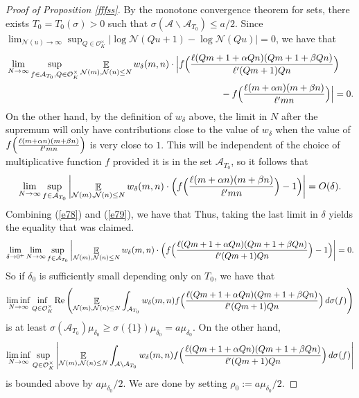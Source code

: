 \documentclass[11pt]{amsart}
\theoremstyle{definition}
\DeclareMathOperator*{\E}{\mathbb{E}}
\newcommand{\NN}{{\mathcal N}}
\begin{document}
\begin{proof}[Proof of Proposition \ref{fffss}]
By the monotone convergence theorem for sets, there exists $T_{0}=T_{0}(\sigma)>0$ such that $\sigma(\mathcal{A}\backslash\mathcal{A}_{T_{0}})\leq a/2$.
Since $\lim_{\NN(u)\to\infty}\sup_{Q\in \mathcal O_K^{\times}}\vert\log\NN(Qu+1)-\log\NN(Qu)\vert=0$,
we have that 
\begin{equation}\label{e78}
    \begin{split}
        &\lim_{N\to\infty}\sup_{f\in \mathcal{A}_{T_{0}},Q\in\mathcal O_K^{\times}}\E_{\NN(m), \NN(n) \leq N}w_{\delta}(m,n)\cdot\Bigl\vert f\Bigl(\frac{\ell(Qm+1+\alpha Qn)(Qm+1+\beta Qn)}{\ell'(Qm+1)Qn}\Bigr) 
        \\&\quad\quad\quad\quad\quad\quad\quad\quad\quad\quad\quad\quad\quad\quad\quad\quad\quad\quad\quad\quad\quad\quad\;\;\;\;-f\Bigl(\frac{\ell(m+\alpha n)(m+\beta n)}{\ell'mn}\Bigr)\Bigr\vert=0.
    \end{split}
\end{equation}
On the other hand, by the definition of $w_{\delta}$ above, the limit in $N$ after the supremum will only have contributions close to the value of $w_{\delta}$ when the value of $f\Bigl(\frac{\ell(m+\alpha n)(m+\beta n)}{\ell'mn}\Bigr)$ is very close to $1$. This will be independent of the choice of multiplicative function $f$ provided it is in the set $\mathcal{A}_{T_0}$, so it follows that
\begin{equation}\label{e79}
    \begin{split}
        \lim_{N\to\infty}\sup_{f\in \mathcal{A}_{T_{0}}} \left| \E_{\NN(m), \NN(n) \leq N}w_{\delta}(m,n)\cdot\Bigl( f\Bigl(\frac{\ell(m+\alpha n)(m+\beta n)}{\ell'mn}\Bigr)-1\Bigr)\right|=O(\delta).
    \end{split}
\end{equation}
 Combining (\ref{e78}) and (\ref{e79}), we have that 
Thus, taking the last limit in $\delta$ yields the equality that was claimed.
    \begin{equation}
    \begin{split}
       \lim_{\delta\to 0^{+}}\lim_{N\to\infty}\sup_{f\in \mathcal{A}_{T_{0}}} \left| \E_{\NN(m), \NN(n) \leq N}w_{\delta}(m,n)\cdot\Bigl( f\Bigl(\frac{\ell(Qm+1+\alpha Qn)(Qm+1+\beta Qn)}{\ell'(Qm+1)Qn}\Bigr)-1\Bigr)\right|=0.
    \end{split}
\end{equation}
So if $\delta_{0}$ is sufficiently small depending only on $T_{0}$, we have that
$$\liminf_{N\to\infty}\inf_{Q\in\mathcal O_K^{\times}}\text{Re}\left(\E_{\NN(m), \NN(n) \leq N}\int_{\mathcal{A}_{T_{0}}}w_{\delta}(m,n)f\Bigl(\frac{\ell(Qm+1+\alpha Qn)(Qm+1+\beta Qn)}{\ell'(Qm+1)Qn}\Bigr)\,d\sigma(f)\right)$$
is at least $\sigma(\mathcal{A}_{T_{0}})\mu_{\delta_{0}}\geq \sigma(\{1\})\mu_{\delta_{0}}=a\mu_{\delta_{0}}$.
On the other hand, 
$$\liminf_{N\to\infty}\sup_{Q\in\mathcal O_K^{\times}}\left|\E_{\NN(m), \NN(n) \leq N}\int_{\mathcal{A}\backslash\mathcal{A}_{T_{0}}}w_{\delta}(m,n)f\Bigl(\frac{\ell(Qm+1+\alpha Qn)(Qm+1+\beta Qn)}{\ell'(Qm+1)Qn}\Bigr)\,d\sigma(f)\right|$$
is bounded above by $a\mu_{\delta_{0}}/2$.  We are done by setting $\rho_{0}:=a\mu_{\delta_{0}}/2$.
\end{proof}
\end{document}
